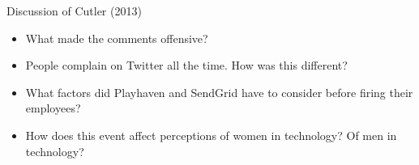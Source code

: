 \documentclass{beamer}
\begin{document}
\begin{frame}{Discussion of Cutler (2013)}
\begin{itemize}
\item What made the comments offensive?
\bigskip
\item People complain on Twitter all the time. How was this different?
\bigskip
\item What factors did Playhaven and SendGrid have to consider before firing their employees?
\bigskip
\item How does this event affect perceptions of women in technology? Of men in technology?
\end{itemize}
\end{frame}
\end{document}

